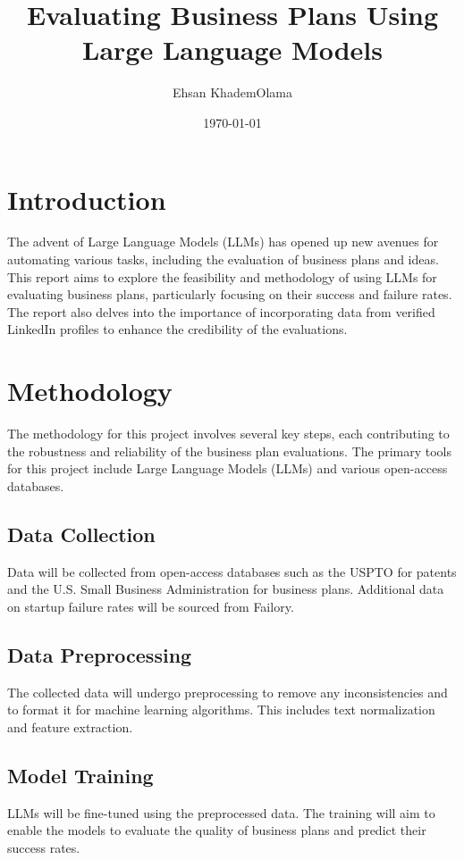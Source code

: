 \documentclass[12pt]{article}
\title{Evaluating Business Plans Using Large Language Models}
\author{Ehsan KhademOlama}
\date{\today}
\begin{document}
	
	\maketitle
	\tableofcontents
	\newpage
	
	\section{Introduction}
	The advent of Large Language Models (LLMs) has opened up new avenues for automating various tasks, including the evaluation of business plans and ideas. This report aims to explore the feasibility and methodology of using LLMs for evaluating business plans, particularly focusing on their success and failure rates. The report also delves into the importance of incorporating data from verified LinkedIn profiles to enhance the credibility of the evaluations.
	
	\section{Methodology}
	
	The methodology for this project involves several key steps, each contributing to the robustness and reliability of the business plan evaluations. The primary tools for this project include Large Language Models (LLMs) and various open-access databases.
	
	\subsection{Data Collection}
	Data will be collected from open-access databases such as the USPTO for patents and the U.S. Small Business Administration for business plans. Additional data on startup failure rates will be sourced from Failory\cite{failory}.
	
	\subsection{Data Preprocessing}
	The collected data will undergo preprocessing to remove any inconsistencies and to format it for machine learning algorithms. This includes text normalization and feature extraction.
	
	\subsection{Model Training}
	LLMs will be fine-tuned using the preprocessed data. The training will aim to enable the models to evaluate the quality of business plans and predict their success rates.
	
\end{document}
